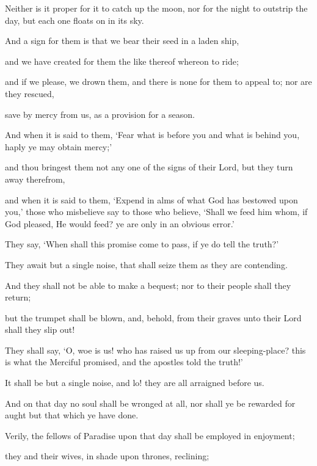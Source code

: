 \documentclass[fontsize=14pt, letterpaper, notitlepage, openany, DIV=12]{scrbook} %
\begin{document}
\noindent[36:40]
Neither is it proper for it to catch up the moon, nor for the night to outstrip the day, but
each one floats on in its sky.

\noindent[36:41]
And a sign for them is that we bear their seed in a laden ship,

\noindent[36:42]
and we have created for them the like thereof whereon to ride;

\noindent[36:43]
and if we please, we drown them, and there is none for them to appeal to; nor are they
rescued,

\noindent[36:44]
save by mercy from us, as a provision for a season.

\noindent[36:45]
And when it is said to them, `Fear what is before you and what is behind you, haply ye
may obtain mercy;'

\noindent[36:46]
and thou bringest them not any one of the signs of their Lord, but they turn away
therefrom,

\noindent[36:47]
and when it is said to them, `Expend in alms of what God has bestowed upon you,' those
who misbelieve say to those who believe, `Shall we feed him whom, if God pleased, He would
feed? ye are only in an obvious error.'

\noindent[36:48]
They say, `When shall this promise come to pass, if ye do tell the truth?'

\noindent[36:49]
They await but a single noise, that shall seize them as they are contending.

\noindent[36:50]
And they shall not be able to make a bequest; nor to their people shall they return;

\noindent[36:51]
but the trumpet shall be blown, and, behold, from their graves unto their Lord shall they
slip out!

\noindent[36:52]
They shall say, `O, woe is us! who has raised us up from our sleeping-place? this is what
the Merciful promised, and the apostles told the truth!'

\noindent[36:53]
It shall be but a single noise, and lo! they are all arraigned before us.

\noindent[36:54]
And on that day no soul shall be wronged at all, nor shall ye be rewarded for aught but
that which ye have done.

\noindent[36:55]
Verily, the fellows of Paradise upon that day shall be employed in enjoyment;

\noindent[36:56]
they and their wives, in shade upon thrones, reclining;
\end{document}
